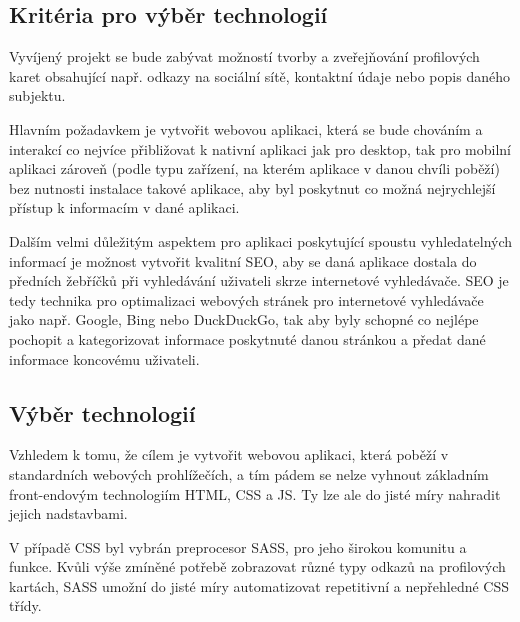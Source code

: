 	\subsection{Kritéria pro výběr technologií}

	Vyvíjený projekt se bude zabývat možností tvorby a zveřejňování profilových karet obsahující např. odkazy na
	sociální sítě, kontaktní údaje nebo popis daného subjektu.

	Hlavním požadavkem je vytvořit webovou aplikaci, která se bude chováním a interakcí co nejvíce přibližovat
	k nativní aplikaci jak pro desktop, tak pro mobilní aplikaci zároveň (podle typu zařízení, na kterém aplikace
	v danou chvíli poběží) bez nutnosti instalace takové aplikace, aby byl poskytnut co možná nejrychlejší přístup
	k informacím v dané aplikaci.

	Dalším velmi důležitým aspektem pro aplikaci poskytující spoustu vyhledatelných informací je možnost vytvořit
	kvalitní SEO, aby se daná aplikace dostala do předních žebříčků při vyhledávání uživateli skrze internetové
	vyhledávače.
	\noindent\Ac{SEO} je tedy technika pro optimalizaci webových stránek pro internetové vyhledávače jako např.
	Google, Bing nebo DuckDuckGo, tak aby byly schopné co nejlépe pochopit a kategorizovat informace poskytnuté
	danou stránkou a předat dané informace koncovému uživateli. \cite{what_is_seo}

	\subsection{Výběr technologií}

	Vzhledem k tomu, že cílem je vytvořit webovou aplikaci, která poběží v standardních webových prohlížečích,
	a tím pádem se nelze vyhnout základním front-endovým technologiím \Ac{HTML}, \Ac{CSS} a \ac{JS}.
	Ty lze ale do jisté míry nahradit jejich nadstavbami.

	V případě \Ac{CSS} byl vybrán preprocesor \Ac{SASS}, pro jeho širokou komunitu a funkce.
	Kvůli výše zmíněné potřebě zobrazovat různé typy odkazů na profilových kartách, \ac{SASS} umožní
	do jisté míry automatizovat repetitivní a nepřehledné \ac{CSS} třídy.

